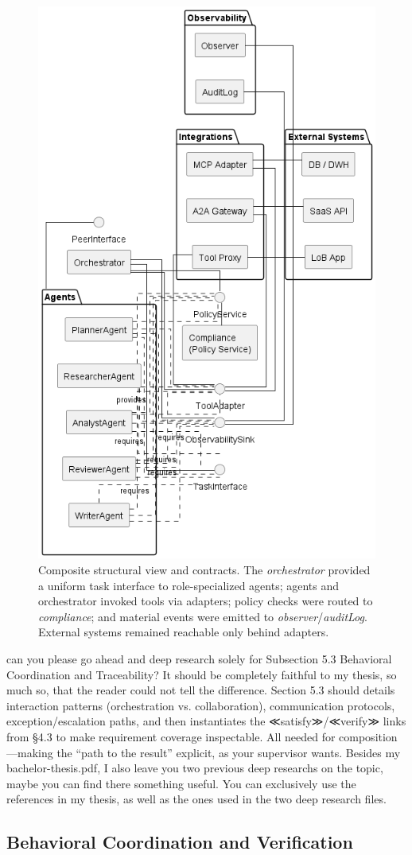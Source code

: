 \begin{figure}[t]
  \centering
  \includegraphics[width=0.5\linewidth]{ressources/MAS/figures/5_2_struct_overview.png}
  \caption{Composite structural view and contracts. The \emph{orchestrator} provided a uniform task interface to role-specialized agents; agents and orchestrator invoked tools via adapters; policy checks were routed to \emph{compliance}; and material events were emitted to \emph{observer}/\emph{auditLog}. External systems remained reachable only behind adapters.}
  \label{fig:5.2-struct-overview}
\end{figure}

can you please go ahead and deep research solely for Subsection 5.3 Behavioral Coordination and Traceability? It should be completely faithful to my thesis, so much so, that the reader could not tell the difference. Section 5.3 should details interaction patterns (orchestration vs. collaboration), communication protocols, exception/escalation paths, and then instantiates the ≪satisfy≫/≪verify≫ links from §4.3 to make requirement coverage inspectable. All needed for composition—making the “path to the result” explicit, as your supervisor wants. Besides my bachelor-thesis.pdf, I also leave you two previous deep researchs on the topic, maybe you can find there something useful. You can exclusively use the references in my thesis, as well as the ones used in the two deep research files.

\subsection{Behavioral Coordination and Verification}


